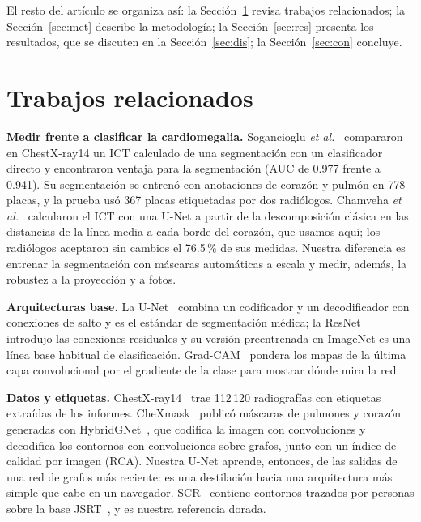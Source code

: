 \documentclass[conference]{IEEEtran}
\begin{document}
El resto del artículo se organiza así: la Sección~\ref{sec:rel} revisa trabajos relacionados; la
Sección~\ref{sec:met} describe la metodología; la Sección~\ref{sec:res} presenta los resultados, que se discuten en la
Sección~\ref{sec:dis}; la Sección~\ref{sec:con} concluye.

\section{Trabajos relacionados}\label{sec:rel}

\textbf{Medir frente a clasificar la cardiomegalia.} Sogancioglu \emph{et al.}~\cite{sogancioglu2020cardiomegaly}
compararon en ChestX-ray14 un ICT calculado de una segmentación con un clasificador directo y encontraron ventaja para
la segmentación (AUC de 0.977 frente a 0.941). Su segmentación se entrenó con anotaciones de corazón y pulmón en 778
placas, y la prueba usó 367 placas etiquetadas por dos radiólogos. Chamveha \emph{et al.}~\cite{chamveha2020ctr}
calcularon el ICT con una U-Net a partir de la descomposición clásica en las distancias de la línea media a cada borde
del corazón, que usamos aquí; los radiólogos aceptaron sin cambios el 76.5\,\% de sus medidas. Nuestra
diferencia es entrenar la segmentación con máscaras automáticas a escala y medir, además, la robustez a la proyección
y a fotos.

\textbf{Arquitecturas base.} La U-Net~\cite{ronneberger2015unet} combina un codificador y un decodificador con
conexiones de salto y es el estándar de segmentación médica; la ResNet~\cite{he2016resnet} introdujo las conexiones
residuales y su versión preentrenada en ImageNet es una línea base habitual de clasificación. Grad-CAM~\cite{selvaraju2017gradcam}
pondera los mapas de la última capa convolucional por el gradiente de la clase para mostrar dónde mira la red.

\textbf{Datos y etiquetas.} ChestX-ray14~\cite{wang2017chestxray8} trae 112\,120 radiografías con etiquetas extraídas
de los informes. CheXmask~\cite{gaggion2024chexmask} publicó máscaras de pulmones y corazón generadas con
HybridGNet~\cite{gaggion2022hybridgnet}, que codifica la imagen con convoluciones y decodifica los contornos con
convoluciones sobre grafos, junto con un índice de calidad por imagen (RCA). Nuestra U-Net aprende, entonces, de las
salidas de una red de grafos más reciente: es una destilación hacia una arquitectura más simple que cabe en un
navegador. SCR~\cite{vanginneken2006scr} contiene contornos trazados por personas
sobre la base JSRT~\cite{shiraishi2000jsrt}, y es nuestra referencia dorada.
\end{document}
